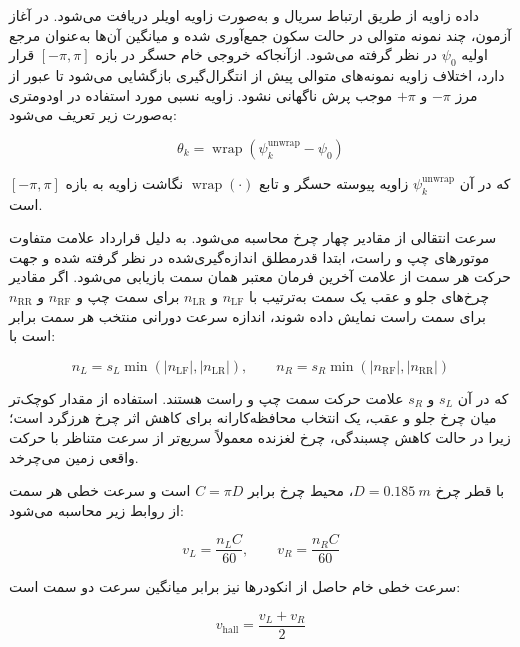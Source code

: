 داده زاویه  از طریق ارتباط سریال و به‌صورت زاویه اویلر دریافت می‌شود. در آغاز آزمون، چند نمونه متوالی در حالت سکون جمع‌آوری شده و میانگین آن‌ها به‌عنوان مرجع اولیه $\psi_0$ در نظر گرفته می‌شود. ازآنجاکه خروجی خام حسگر در بازه $[-\pi,\pi]$ قرار دارد، اختلاف زاویه نمونه‌های متوالی پیش از انتگرال‌گیری بازگشایی می‌شود تا عبور از مرز $-\pi$ و $+\pi$ موجب پرش ناگهانی نشود. زاویه نسبی مورد استفاده در اودومتری به‌صورت زیر تعریف می‌شود:

\begin{equation}
	\theta_k =
	\operatorname{wrap}
	\left(
	\psi^{\mathrm{unwrap}}_k-\psi_0
	\right)
	\label{eq:real_imu_relative_yaw}
\end{equation}

که در آن $\psi^{\mathrm{unwrap}}_k$ زاویه پیوسته حسگر و تابع
$\operatorname{wrap}(\cdot)$ نگاشت زاویه به بازه $[-\pi,\pi]$ است.

سرعت انتقالی از مقادیر  چهار چرخ محاسبه می‌شود. به دلیل قرارداد علامت متفاوت موتورهای چپ و راست، ابتدا قدرمطلق  اندازه‌گیری‌شده در نظر گرفته شده و جهت حرکت هر سمت از علامت آخرین فرمان معتبر همان سمت بازیابی می‌شود. اگر مقادیر  چرخ‌های جلو و عقب یک سمت به‌ترتیب با
$n_{\mathrm{LF}}$ و $n_{\mathrm{LR}}$ برای سمت چپ و
$n_{\mathrm{RF}}$ و $n_{\mathrm{RR}}$ برای سمت راست نمایش داده شوند، اندازه سرعت دورانی منتخب هر سمت برابر است با:

\begin{equation}
	n_L =
	s_L\min
	\left(
	|n_{\mathrm{LF}}|,
	|n_{\mathrm{LR}}|
	\right),
	\qquad
	n_R =
	s_R\min
	\left(
	|n_{\mathrm{RF}}|,
	|n_{\mathrm{RR}}|
	\right)
	\label{eq:real_odom_side_rpm}
\end{equation}

که در آن $s_L$ و $s_R$ علامت حرکت سمت چپ و راست هستند. استفاده از مقدار کوچک‌تر میان چرخ جلو و عقب، یک انتخاب محافظه‌کارانه برای کاهش اثر چرخ هرزگرد است؛ زیرا در حالت کاهش چسبندگی، چرخ لغزنده معمولاً سریع‌تر از سرعت متناظر با حرکت واقعی زمین می‌چرخد.

با قطر چرخ $D=0.185~m$، محیط چرخ برابر $C=\pi D$ است و سرعت خطی هر سمت از روابط زیر محاسبه می‌شود:

\begin{equation}
	v_L = \frac{n_L C}{60},
	\qquad
	v_R = \frac{n_R C}{60}
	\label{eq:real_odom_side_velocity}
\end{equation}

سرعت خطی خام حاصل از انکودرها نیز برابر میانگین سرعت دو سمت است:

\begin{equation}
	v_{\mathrm{hall}} =
	\frac{v_L+v_R}{2}
	\label{eq:real_odom_hall_velocity}
\end{equation}

